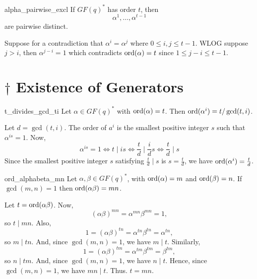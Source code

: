 
\begin{Theorem}{}{alpha_pairwise_excl}
    If $ GF(q)^* $ has order $ t $, then
    \[ \alpha^1,\ldots,\alpha^{t-1} \]
    are pairwise distinct.
\end{Theorem}

\begin{Proof}{}{}
    Suppose for a contradiction that $ \alpha^i=\alpha^j $ where $ 0\leqslant i,j\leqslant t-1 $.
    WLOG suppose $ j>i $, then $ \alpha^{j-i}=1 $ which contradicts $ \operatorname{ord}(\alpha)=t $
    since $ 1\leqslant j-i\leqslant t-1 $.
\end{Proof}

\section{\texorpdfstring{$ \dagger $}{†} Existence of Generators}

\begin{Lemma}{}{t_divides_gcd_ti}
    Let $ \alpha\in GF(q)^* $ with $ \operatorname{ord}(\alpha)=t $. Then $ \operatorname{ord}(\alpha^i)=
        t/\gcd(t,i) $.
\end{Lemma}

\begin{Proof}{}{}
    Let $ d=\gcd(t,i) $. The order of $ a^i $ is the smallest positive
    integer $ s $ such that $ \alpha^{is}=1 $. Now,
    \[ \alpha^{is}=1\iff t\mid is\iff \frac{t}{d}\mid \frac{i}{d}s
        \iff \frac{t}{d} \mid s \]
    Since the smallest positive integer $ s $ satisfying $ \frac{t}{d} \mid s $
    is $ s=\frac{t}{d} $, we have $ \operatorname{ord}(\alpha^i)=\frac{t}{d} $.
\end{Proof}

\begin{Lemma}{}{ord_alphabeta_mn}
    Let $ \alpha,\beta\in GF(q)^* $, with $ \operatorname{ord}(\alpha)=m $ and $ \operatorname{ord}(\beta)=n $.
    If $ \gcd(m,n)=1 $ then $ \operatorname{ord}(\alpha\beta)=mn $.
\end{Lemma}

\begin{Proof}{}{}
    Let $ t=\operatorname{ord}(\alpha\beta) $. Now,
    \[ (\alpha\beta)^{mn}=\alpha^{mn}\beta^{mn}=1, \]
    so $ t\mid mn $. Also,
    \[ 1=(\alpha\beta)^{tn}=\alpha^{tn}\beta^{tn}=\alpha^{tn}, \]
    so $ m\mid tn $. And, since $ \gcd(m,n)=1 $, we have $ m\mid t $. Similarly,
    \[ 1=(\alpha\beta)^{tm}=\alpha^{tm}\beta^{tm}=\beta^{tm}, \]
    so $ n\mid tm $. And, since $ \gcd(m,n)=1 $, we have $ n\mid t $. Hence, since $ \gcd(m,n)=1 $,
    we have $ mn\mid t $. Thus. $ t=mn $.
\end{Proof}

